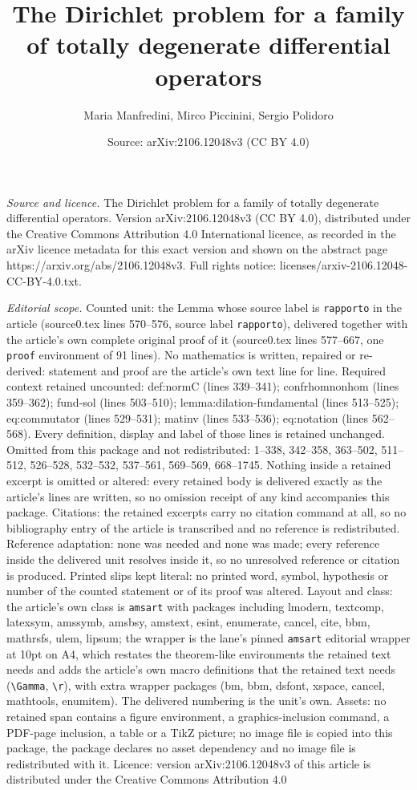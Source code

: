 \documentclass[10pt,a4paper]{amsart}
\title[The Dirichlet problem for a family of totally degenerate dif]{The Dirichlet problem for a family of totally degenerate differential operators}
\author{Maria Manfredini, Mirco Piccinini, Sergio Polidoro}
\date{Source: arXiv:2106.12048v3 (CC BY 4.0)}
\begin{document}
\maketitle

\noindent\emph{Source and licence.} The Dirichlet problem for a family of totally degenerate differential operators. Version arXiv:2106.12048v3 (CC BY 4.0), distributed under the Creative Commons Attribution 4.0 International licence, as recorded in the arXiv licence metadata for this exact version and shown on the abstract page https://arxiv.org/abs/2106.12048v3. Full rights notice: licenses/arxiv-2106.12048-CC-BY-4.0.txt.\par\smallskip

\noindent\textit{Editorial scope.} Counted unit: the Lemma whose source label is \texttt{rapporto} in the article (source0.tex lines 570--576, source label \texttt{rapporto}), delivered together with the article's own complete original proof of it (source0.tex lines 577--667, one \texttt{proof} environment of 91 lines). No mathematics is written, repaired or re-derived: statement and proof are the article's own text line for line. Required context retained uncounted: def:normC (lines 339--341); confrhomnonhom (lines 359--362); fund-sol (lines 503--510); lemma:dilation-fundamental (lines 513--525); eq:commutator (lines 529--531); matinv (lines 533--536); eq:notation (lines 562--568). Every definition, display and label of those lines is retained unchanged. Omitted from this package and not redistributed: 1--338, 342--358, 363--502, 511--512, 526--528, 532--532, 537--561, 569--569, 668--1745. Nothing inside a retained excerpt is omitted or altered: every retained body is delivered exactly as the article's lines are written, so no omission receipt of any kind accompanies this package. Citations: the retained excerpts carry no citation command at all, so no bibliography entry of the article is transcribed and no reference is redistributed. Reference adaptation: none was needed and none was made; every reference inside the delivered unit resolves inside it, so no unresolved reference or citation is produced. Printed slips kept literal: no printed word, symbol, hypothesis or number of the counted statement or of its proof was altered. Layout and class: the article's own class is \texttt{amsart} with packages including lmodern, textcomp, latexsym, amssymb, amsbsy, amstext, esint, enumerate, cancel, cite, bbm, mathrsfs, ulem, lipsum; the wrapper is the lane's pinned \texttt{amsart} editorial wrapper at 10pt on A4, which restates the theorem-like environments the retained text needs and adds the article's own macro definitions that the retained text needs (\texttt{\textbackslash Gamma}, \texttt{\textbackslash r}), with extra wrapper packages (bm, bbm, dsfont, xspace, cancel, mathtools, enumitem). The delivered numbering is the unit's own. Assets: no retained span contains a figure environment, a graphics-inclusion command, a PDF-page inclusion, a table or a TikZ picture; no image file is copied into this package, the package declares no asset dependency and no image file is redistributed with it. Licence: version arXiv:2106.12048v3 of this article is distributed under the Creative Commons Attribution 4.0 
\end{document}
